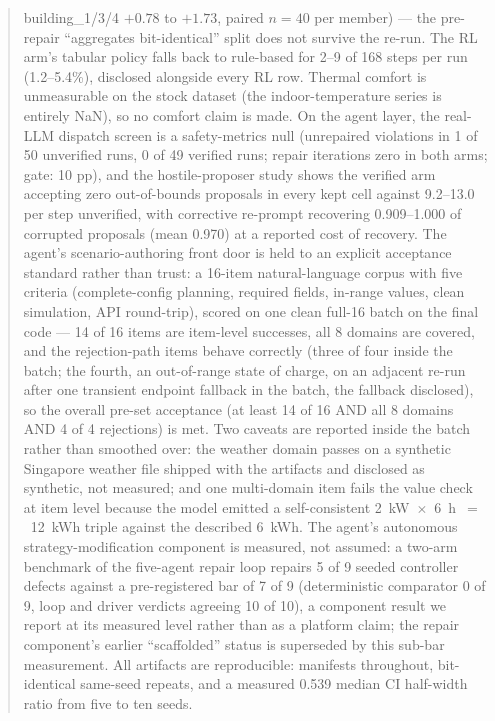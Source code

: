 \documentclass[11pt,a4paper]{article}
\begin{document}
\begin{abstract}
building\_1/3/4 $+0.78$ to $+1.73$, paired $n{=}40$ per member) --- the
pre-repair ``aggregates bit-identical'' split does not survive the re-run.
The RL arm's tabular policy falls back to rule-based for 2--9 of 168 steps
per run (1.2--5.4\%), disclosed alongside every RL row. Thermal comfort is
unmeasurable on the stock dataset (the indoor-temperature series is
entirely NaN), so no comfort claim is made. On the agent layer, the
real-LLM dispatch screen is a safety-metrics null (unrepaired violations
in 1 of 50 unverified runs, 0 of 49 verified runs; repair iterations zero
in both arms; gate: 10 pp), and the hostile-proposer study shows the
verified arm accepting zero out-of-bounds proposals in every kept cell
against 9.2--13.0 per step unverified, with corrective re-prompt
recovering 0.909--1.000 of corrupted proposals (mean 0.970) at a reported
cost of recovery. The agent's scenario-authoring front door is held to an
explicit acceptance standard rather than trust: a 16-item natural-language
corpus with five criteria (complete-config planning, required fields,
in-range values, clean simulation, API round-trip), scored on one clean
full-16 batch on the final code --- 14 of 16 items are item-level successes,
all 8 domains are covered, and the rejection-path items behave correctly
(three of four inside the batch; the fourth, an out-of-range state of
charge, on an adjacent re-run after one transient endpoint fallback in the
batch, the fallback disclosed), so the overall pre-set acceptance (at least
14 of 16 AND all 8 domains AND 4 of 4 rejections) is met. Two caveats are
reported inside the batch rather than smoothed over: the weather domain
passes on a synthetic Singapore weather file shipped with the artifacts and
disclosed as synthetic, not measured; and one multi-domain item fails the
value check at item level because the model emitted a self-consistent
2~kW~$\times$~6~h~$=$~12~kWh triple against the described 6~kWh. The agent's autonomous strategy-modification component is
measured, not assumed: a two-arm benchmark of the five-agent repair loop
repairs 5 of 9 seeded controller defects against a pre-registered bar of
7 of 9 (deterministic comparator 0 of 9, loop and driver verdicts
agreeing 10 of 10), a component result we report at its measured level
rather than as a platform claim; the repair component's earlier
``scaffolded'' status is superseded by this sub-bar measurement. All
artifacts are reproducible: manifests
throughout, bit-identical same-seed repeats, and a measured 0.539 median
CI half-width ratio from five to ten seeds.
\end{abstract}
\end{document}
